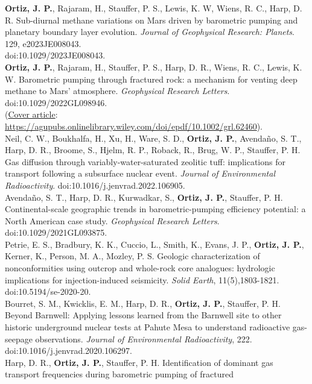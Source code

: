 \documentclass[11pt, letterpaper]{article}
\newcommand{\years}[1]{\marginnote{\scriptsize #1}}
\begin{document}
\noindent
\years{2024}\textbf{Ortiz, J. P.}, Rajaram, H., Stauffer, P. S., Lewis, K. W,
Wiens, R. C., Harp, D. R.  Sub-diurnal methane variations on Mars driven by
barometric pumping and planetary boundary layer evolution.  \emph{Journal of
Geophysical Research: Planets}. 129, e2023JE008043.\\doi:10.1029/2023JE008043.\\ 
\years{2022}\textbf{Ortiz, J. P.}, Rajaram, H., Stauffer, P. S., Harp, D. R.,
Wiens, R. C., Lewis, K. W.  Barometric pumping through fractured rock: a
mechanism for venting deep methane to Mars' atmosphere.  \emph{Geophysical
Research Letters}. doi:10.1029/2022GL098946. \\(\underline{Cover article}:
\href{https://agupubs.onlinelibrary.wiley.com/doi/epdf/10.1002/grl.62460}{https://agupubs.onlinelibrary.wiley.com/doi/epdf/10.1002/grl.62460}).\\ 
\years{2022}Neil, C. W., Boukhalfa, H., Xu, H., Ware, S. D., \textbf{Ortiz, J.
P.}, Avendaño, S. T., Harp, D. R., Broome, S., Hjelm, R. P., Roback, R., Brug,
W. P., Stauffer, P. H. Gas diffusion through variably-water-saturated zeolitic
tuff: implications for transport following a subsurface nuclear event.
\emph{Journal of Environmental Radioactivity}.
doi:10.1016/j.jenvrad.2022.106905.\\
\years{2021}Avendaño, S. T., Harp, D. R., Kurwadkar, S., \textbf{Ortiz, J.
P.}, Stauffer, P. H. Continental-scale geographic trends in barometric-pumping
efficiency potential: a North American case study.
\emph{Geophysical Research Letters}.  doi:10.1029/2021GL093875.\\
\years{2020}Petrie, E. S., Bradbury, K. K., Cuccio, L., Smith, K., Evans, J.
P., \textbf{Ortiz, J. P.}, Kerner, K., Person, M. A., Mozley, P. S.
Geologic characterization of nonconformities using outcrop and whole-rock core
analogues: hydrologic implications for injection-induced seismicity.
\emph{Solid Earth}, 11(5),1803-1821. doi:10.5194/se-2020-20.\\
\years{2020}Bourret, S. M., Kwicklis, E. M., Harp, D. R., \textbf{Ortiz, J.
P.}, Stauffer, P. H. Beyond Barnwell: Applying lessons learned from the
Barnwell site to other historic underground nuclear tests at Pahute Mesa to
understand radioactive gas-seepage observations. \emph{Journal of Environmental
Radioactivity}, 222. doi:10.1016/j.jenvrad.2020.106297.\\
\years{2019}Harp, D. R., \textbf{Ortiz, J. P.}, Stauffer, P. H. Identification
of dominant gas transport frequencies during barometric pumping of fractured
\end{document}
